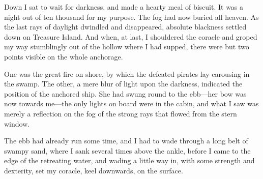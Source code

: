 Down I sat to wait for darkness, and made a hearty meal of biscuit. It was a night out of ten thousand for my purpose. The fog had now buried all heaven. As the last rays of daylight dwindled and disappeared, absolute blackness settled down on Treasure Island. And when, at last, I shouldered the coracle and groped my way stumblingly out of the hollow where I had supped, there were but two points visible on the whole anchorage.

One was the great fire on shore, by which the defeated pirates lay carousing in the swamp. The other, a mere blur of light upon the darkness, indicated the position of the anchored ship. She had swung round to the ebb---her bow was now towards me---the only lights on board were in the cabin, and what I saw was merely a reflection on the fog of the strong rays that flowed from the stern window.

The ebb had already run some time, and I had to wade through a long belt of swampy sand, where I sank several times above the ankle, before I came to the edge of the retreating water, and wading a little way in, with some strength and dexterity, set my coracle, keel downwards, on the surface.